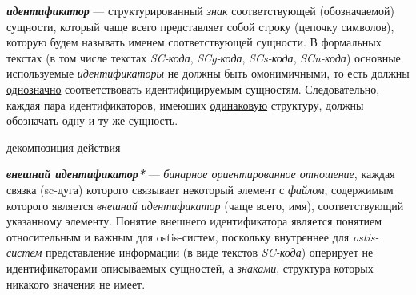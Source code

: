 \textit{\textbf{идентификатор}} --- структурированный \textit{знак} соответствующей (обозначаемой) сущности, который чаще всего представляет собой строку (цепочку символов), которую будем называть именем соответствующей сущности.
В формальных текстах (в том числе текстах \textit{SC-кода}, \textit{SCg-кода}, \textit{SCs-кода}, \textit{SCn-кода}) основные используемые \textit{идентификаторы} не должны быть омонимичными, то есть должны \underline{однозначно} соответствовать идентифицируемым сущностям.
Следовательно, каждая пара идентификаторов, имеющих \underline{одинаковую} структуру, должны обозначать одну и ту же сущность.

\begin{SCn}

    \begin{scnrelfromset}{декомпозиция действия}
        \begin{scnindent}
        \end{scnindent}
        \begin{scnindent}
        \end{scnindent}
    \end{scnrelfromset}

\end{SCn}

\textit{\textbf{внешний идентификатор*}} --- \textit{бинарное ориентированное отношение}, каждая связка (sc-дуга) которого связывает некоторый элемент с \textit{файлом}, содержимым которого является \textit{внешний идентификатор} (чаще всего, имя), соответствующий указанному элементу.
Понятие внешнего идентификатора является понятием относительным и важным для ostis-систем, поскольку внутреннее для \textit{ostis-систем} представление информации (в виде текстов \textit{SC-кода}) оперирует не идентификаторами описываемых сущностей, а \textit{знаками}, структура которых никакого значения не имеет.

\begin{SCn}



\end{SCn}

